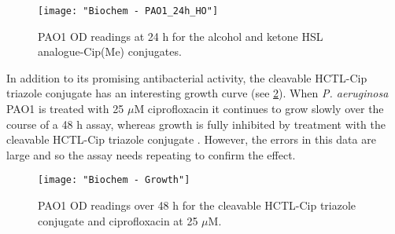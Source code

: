 \begin{figure}[H]
	\begin{center}
		\texttt{[image: "Biochem - PAO1\_24h\_HO"]}
		\caption{PAO1 OD readings at 24 h for the alcohol and ketone HSL analogue-Cip(Me) conjugates.\label{fgr:PAO1_24h_HO}}
	\end{center}
\end{figure}

%
%
%
%
%

In addition to its promising antibacterial activity, the cleavable HCTL-Cip triazole conjugate  has an interesting growth curve (see \ref{fgr:growth}).
When \textit{P. aeruginosa} PAO1 is treated with 25 $\mu$M ciprofloxacin  it continues to grow slowly over the course of a 48 h assay, whereas growth is fully inhibited by treatment with the cleavable HCTL-Cip triazole conjugate . However, the errors in this data are large and so the assay needs repeating to confirm the effect.

\begin{figure}[H]
	\begin{center}
		\texttt{[image: "Biochem - Growth"]}
		\caption{PAO1 OD readings over 48 h for the cleavable HCTL-Cip triazole conjugate  and ciprofloxacin  at 25 $\mu$M.\label{fgr:growth}}
	\end{center}
\end{figure}

